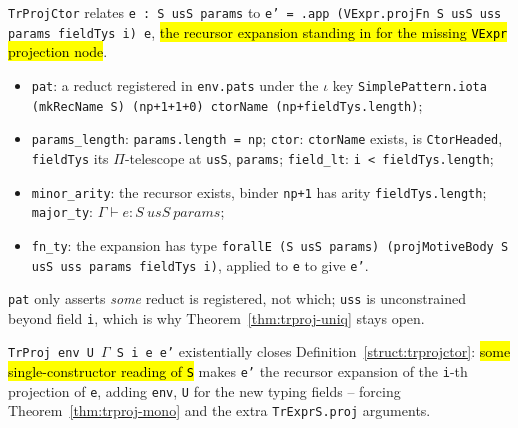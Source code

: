 \begin{definition}
\label{struct:trprojctor}
\leanok
{}
 

 \texttt{TrProjCtor} relates \texttt{e : S usS params} to \texttt{e' = .app (VExpr.projFn S usS uss params fieldTys i) e}, \hl{the recursor expansion standing in for the missing \texttt{VExpr} projection node}.
\begin{itemize}
\item \texttt{pat}: a reduct registered in \texttt{env.pats} under the $\iota$ key \texttt{SimplePattern.iota (mkRecName S) (np+1+1+0) ctorName (np+fieldTys.length)};
\item \texttt{params\_length}: \texttt{params.length = np}; \texttt{ctor}: \texttt{ctorName} exists, is \texttt{CtorHeaded}, \texttt{fieldTys} its $\Pi$-telescope at \texttt{usS}, \texttt{params}; \texttt{field\_lt}: \texttt{i < fieldTys.length};
\item \texttt{minor\_arity}: the recursor exists, binder \texttt{np+1} has arity \texttt{fieldTys.length}; \texttt{major\_ty}: $\Gamma \vdash e : S\ usS\ params$;
\item \texttt{fn\_ty}: the expansion has type \texttt{forallE (S usS params) (projMotiveBody S usS uss params fieldTys i)}, applied to \texttt{e} to give \texttt{e'}.
\end{itemize}
\end{definition}

\begin{remark}
 \texttt{pat} only asserts \emph{some} reduct is registered, not which; \texttt{uss} is unconstrained beyond field \texttt{i}, which is why Theorem~\ref{thm:trproj-uniq} stays open.
\end{remark}

\begin{definition}
\label{def:trproj}
\leanok
{}
 

 \texttt{TrProj env U $\Gamma$ S i e e'} existentially closes Definition~\ref{struct:trprojctor}: \hl{some single-constructor reading of \texttt{S}} makes \texttt{e'} the recursor expansion of the \texttt{i}-th projection of \texttt{e}, adding \texttt{env}, \texttt{U} for the new typing fields -- forcing Theorem~\ref{thm:trproj-mono} and the extra \texttt{TrExprS.proj} arguments.
\end{definition}

